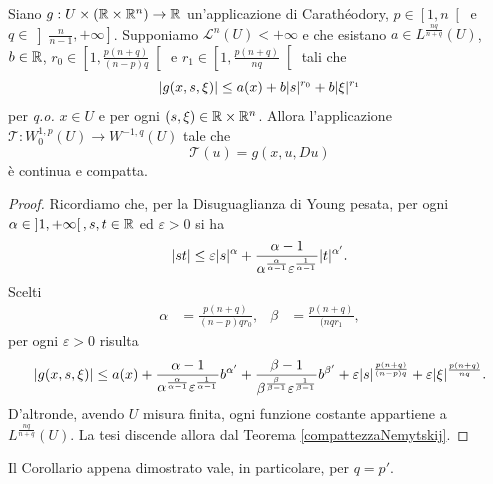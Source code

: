 \begin{corollario}
Siano $g : U \times (\mathbb{R} \times \mathbb{R}^n) \to \mathbb{R}$ un'applicazione di Carathéodory, $p \in \left[ 1,n\right[$ e $q \in \left] \frac{n}{n-1},+\infty\right] $. Supponiamo $\mathcal{L}^n(U)<+\infty$ e che esistano $a \in L^{\frac{nq}{n+q}}(U)$, $b \in \mathbb{R}$, $r_0 \in \left[ 1,\frac{p(n+q)}{(n-p)q}\right[$ e $r_1 \in \left[ 1,\frac{p(n+q)}{nq}\right[$  tali che 
\[ \lvert g(x,s,\xi)\rvert \le a(x) + b\lvert s\rvert^{r_0} + b \lvert\xi\rvert^{r_1} \]
per \emph{q.o.} $x \in U$ e per ogni $(s,\xi) \in \mathbb{R} \times \mathbb{R}^n$. Allora l’applicazione $\mathcal{T}: W^{1,p}_0(U) \to W^{-1,q}(U)$ tale che
\[ \mathcal{T}(u) = g(x,u,Du) \]
è continua e compatta.
\end{corollario}
\begin{proof}
Ricordiamo che, per la Disuguaglianza di Young pesata, per ogni $\alpha \in \left] 1,+\infty\right[, s,t \in \mathbb{R}$ ed $\varepsilon >0$ si ha
\[ \lvert st\rvert \le \varepsilon \lvert s\rvert^{\alpha} + \frac{\alpha-1}{\alpha^{\frac{\alpha}{\alpha-1}}\varepsilon^{\frac{1}{\alpha -1}}}\lvert t\rvert^{\alpha'}. \]
Scelti 
\begin{align*}
	\alpha &= \frac{p(n+q)}{(n-p)qr_0}, & \beta &=\frac{p(n+q)}{(nqr_1},
\end{align*}
per ogni $\varepsilon > 0$ risulta
\[ \lvert g(x,s,\xi)\rvert \le a(x) + \frac{\alpha -1}{\alpha^{\frac{\alpha}{\alpha-1}}\varepsilon^{\frac{1}{\alpha -1}}}b^{\alpha'} + \frac{\beta -1}{\beta^{\frac{\beta}{\beta-1}}\varepsilon^{\frac{1}{\beta -1}}}b^{\beta'} + \varepsilon\lvert s\rvert^{\frac{p(n+q)}{(n-p)q}} + \varepsilon \lvert\xi\rvert^{\frac{p(n+q)}{nq}}. \]
D’altronde, avendo $U$ misura finita, ogni funzione costante appartiene a $L^{\frac{nq}{n+q}}(U)$. La tesi discende allora dal Teorema \eqref{compattezzaNemytskij}.
\end{proof}

\begin{osservazione}
	Il Corollario appena dimostrato vale, in particolare, per $q = p'$.
\end{osservazione}